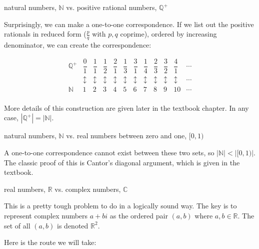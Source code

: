 \documentclass[../key.tex]{subfiles}
\begin{document}
\begin{inner_problem}
\item natural numbers, $\mathbb{N}$ vs. positive rational numbers, $\mathbb{Q}^+$
\end{inner_problem}

\noindent Surprisingly, we can make a one-to-one correspondence. If we list out the positive rationals in reduced form ($\frac{p}{q}$ with $p,q$ coprime), ordered by increasing denominator, we can create the correspondence:

$$\renewcommand{\arraystretch}{1.6}\begin{array}{cccccccccccc}
\mathbb{Q}^+ & \dfrac{0}{1} & \dfrac{1}{1} & \dfrac{1}{2} & \dfrac{2}{1} & \dfrac{1}{3} & \dfrac{3}{1} & \dfrac{1}{4} & \dfrac{2}{3} & \dfrac{3}{2} & \dfrac{4}{1} & \cdots \\
& \updownarrow & \updownarrow & \updownarrow & \updownarrow & \updownarrow & \updownarrow & \updownarrow & \updownarrow & \updownarrow & \updownarrow & \cdots \\
\mathbb{N} & 1 & 2 & 3 & 4 & 5 & 6 & 7 & 8 & 9 & 10 & \cdots \\
\end{array}$$

\noindent More details of this construction are given later in the textbook chapter. In any case, $\left|\mathbb{Q}^+\right| = |\mathbb{N}|.$

\begin{inner_problem}
\item natural numbers, $\mathbb{N}$ vs. real numbers between zero and one, $[0,1)$
\end{inner_problem}

\noindent A one-to-one correspondence cannot exist between these two sets, so $\left|\mathbb{N}\right| < \left|[0,1)\right|$. The classic proof of this is Cantor's diagonal argument, which is given in the textbook.

\begin{inner_problem}
\item real numbers, $\mathbb{R}$ vs. complex numbers, $\mathbb{C}$
\end{inner_problem}

\noindent This is a pretty tough problem to do in a logically sound way. The key is to represent complex numbers $a+bi$ as the ordered pair $(a,b)$ where $a,b\in \mathbb{R}$. The set of all $(a,b)$ is denoted $\mathbb{R}^2$.

Here is the route we will take:
\end{document}
